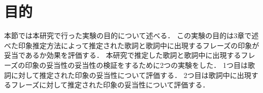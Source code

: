 \section{目的}
本節では本研究で行った実験の目的について述べる．
この実験の目的は3章で述べた印象推定方法によって推定された歌詞と歌詞中に出現するフレーズの印象が妥当であるか効果を評価する．
本研究で推定した歌詞と歌詞中に出現するフレーズの印象の妥当性の妥当性の検証をするために2つの実験をした．
1つ目は歌詞に対して推定された印象の妥当性について評価する．
2つ目は歌詞中に出現するフレーズに対して推定された印象の妥当性について評価する．
